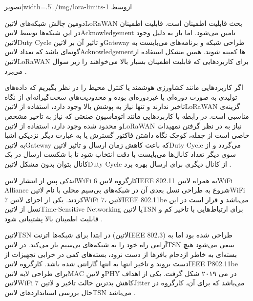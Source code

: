 ‌تصویر[width=.5\textwidth]{./img/lora-limits-1}
‌ازوسط

دومین چالش شبکه‌های ‌لاتین{LoRaWAN} بحث قابلیت اطمینان است. قابلیت اطمینان در این شبکه‌ها توسط ‌لاتین{Acknowledgement} تامین می‌شود.
اما باز به دلیل وجود ‌لاتین{Duty Cycle} و تاثیر آن بر ‌لاتین{Gateway} طراحی شبکه و برنامه‌های می‌بایست به گونه‌ای باشد که تعداد ‌لاتین{Acknowledgement}ها کمینه شوند.
همین مشکل استفاده از ‌لاتین{LoRaWAN} برای کاربردهایی که قابلیت اطمینان بسیار بالا می‌خواهند را زیر سوال می‌برد
.

اگر کاربردهایی مانند کشاورزی هوشمند یا کنترل محیط را در نظر بگیریم که داده‌های تولیدی به صورت دوره‌ای یا غیردوره‌ای بوده و محدودیت‌های سخت‌گیرانه‌ای از نگاه تاخیر ندارند و تنها نیاز به پوشش بالا وجود دارد،
استفاده از ‌لاتین{LoRaWAN} گزینه‌ی مناسبی است. در رابطه با کاربردهایی مانند اتوماسیون صنعتی که نیاز به تاخیر مشخص و محدود شده وجود دارد، استفاده از ‌لاتین{LoRaWAN} نیاز به در نظر گرفتن تمهیدات
خاصی است از جمله، کوچک نگاه داشتن فاکتور گسترش یا به عبارت دیگر نزدیکی اشیا به ‌لاتین{Gateway} که باعث کاهش زمان ارسال و تاثیر ‌لاتین{Duty Cycle} می‌گردد و از سوی دیگر تعداد کانال‌ها می‌بایست
با دقت انتخاب شود تا با شکست ارسال در یک کانال بتوان بدون مشکل ‌لاتین{Duty Cycle} از کانال دیگری برای ارسال بهره برد
.


اندکی پس از انتشار ‌لاتین{WiFi 6} کارگروه ‌لاتین{IEEE 802.11} به همراه ‌لاتین{WiFi Alliance} شروع به طراحی نسل بعدی آن در شبکه‌های بی‌سیم محلی با نام ‌لاتین{WiFi 7} کردند.
یکی از اجزای ‌لاتین{WiFi 7}، ‌لاتین{IEEE 802.11be} می‌باشد و قرار است در این نسل از ‌لاتین{Time-Sensitive Networking} یا ‌لاتین{TSN} برای ارتباط‌هایی با تاخیر کم و قابلیت
اطمینان بالا پشتیبانی شود
.

‌لاتین{TSN} در ابتدا برای شبکه‌ها اترنت (‌لاتین{IEEE 802.3}) طراحی شده بود اما به آرامی راه خود را به شبکه‌های بی‌سیم باز می‌کند. در ‌لاتین{TSN} سعی می‌شود
هیچ بسته‌ای به خاطر ازدحام بافرها از دست نرود، بسته‌های کمی در خرابی تجهیزات از دست بروند و تاخیر انتها به انتها گارانتی شده باشد.
کارگروه ‌لاتین{IEEE P802.11be} برای طراحی لایه ‌لاتین{MAC} و ‌لاتین{PHY} در می ۲۰۱۹ شکل گرفت. یکی از اهداف ‌لاتین{WiFi 7} کاهش بدترین حالت تاخیر و ‌لاتین{Jitter} می‌باشد
که برای آن، کارگروه در حال بررسی استانداردهای ‌لاتین{TSN} می‌باشد
.

